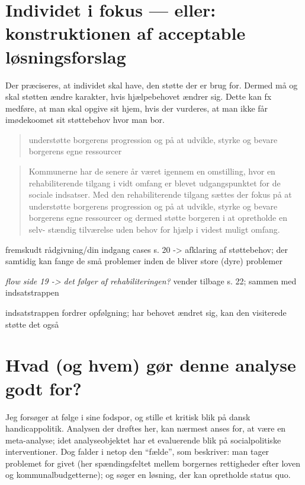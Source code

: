 \section{Individet i fokus — eller: konstruktionen af acceptable løsningsforslag}
Der præciseres, at individet skal have, den støtte der er brug for.
Dermed må og skal støtten ændre karakter, hvis hjælpebehovet ændrer sig.
Dette kan fx medføre, at man skal opgive sit hjem, hvis der vurderes, at man ikke får imødekoomet sit støttebehov hvor man bor.
\blockquote{understøtte borgerens progression og på at udvikle, styrke og bevare borgerens egne ressourcer}
\blockquote{Kommunerne har de senere år været igennem en omstilling, hvor en rehabiliterende tilgang i vidt omfang er blevet udgangspunktet for de sociale indsatser. Med den rehabiliterende tilgang sættes der fokus på at understøtte borgerens progression og på at udvikle, styrke og bevare borgerens egne ressourcer og dermed støtte borgeren i at opretholde en selv- stændig tilværelse uden behov for hjælp i videst muligt omfang.}\autocite[s. 19]{klStyringAfDet2017}

fremskudt rådgivning/din indgang cases s. 20 -> afklaring af støttebehov; der samtidig kan fange de små problemer inden de bliver store (dyre) problemer

\textit{flow side 19 -> det følger af rehabiliteringen?} vender tilbage s. 22; sammen med indsatstrappen

indsatstrappen fordrer opfølgning; har behovet ændret sig, kan den visiterede støtte det også

\section{Hvad (og hvem) gør denne analyse godt for?}
Jeg forsøger at følge i  sine fodspor, og stille et kritisk blik på dansk handicappolitik.
Analysen der drøftes her, kan nærmest anses for, at være en meta-analyse; idet analyseobjektet har et evaluerende blik på socialpolitiske interventioner.
Dog falder  i netop den “fælde”, som \citeauthor{scheurichPolicyArchaeologyNew1994} beskriver: man tager problemet for givet (her spændingsfeltet mellem borgernes rettigheder efter loven og kommunalbudgetterne); og søger en løsning, der kan opretholde status quo.
